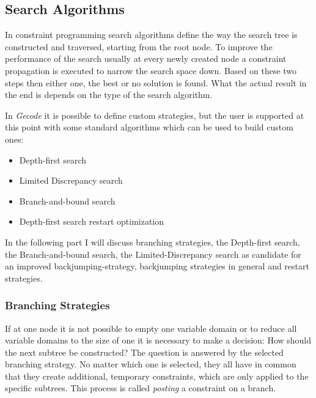 \documentclass[10pt,
               a4paper,
               journal,
               ]{IEEEtran}
\begin{document}
	\subsection{Search Algorithms}
	In constraint programming search algorithms define the way the search tree is constructed and traversed, starting from the root node. To improve the performance of the search usually at every newly created node a constraint propagation is executed to narrow the search space down. Based on these two steps then either one, the best or no solution is found. What the actual result in the end is depends on the type of the search algorithm.
	
	In \emph{Gecode} it is possible to define custom strategies, but the user is supported at this point with some standard algorithms which can be used to build custom ones:
	\begin{itemize}
		\item Depth-first search
		\item Limited Discrepancy search
		\item Branch-and-bound search
		\item Depth-first search restart optimization
	\end{itemize}
	
	In the following part I will discuss branching strategies, the Depth-first search, the Branch-and-bound search, the Limited-Discrepancy search as candidate for an improved backjumping-strategy, backjumping strategies in general and restart strategies.
	
	\subsubsection{Branching Strategies}
	If at one node it is not possible to empty one variable domain or to reduce all variable domains to the size of one it is necessary to make a decision: How should the next subtree be constructed? The question is answered by the selected branching strategy. No matter which one is selected, they all have in common that they create additional, temporary constraints, which are only applied to the specific subtrees. This process is called \emph{posting} a constraint on a branch.
	
\end{document}
